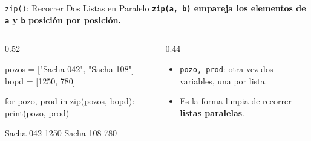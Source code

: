\documentclass[aspectratio=169, 11pt]{beamer}
\begin{document}
\begin{frame}[fragile,shrink=18]{\texttt{zip()}: Recorrer Dos Listas en Paralelo}
  \vspace{-4pt}
  {\small\color{arcaDark}\bfseries
    \texttt{zip(a, b)} empareja los elementos de \texttt{a} y \texttt{b} posición por posición.}

  \vspace{5pt}
  \begin{columns}[T]
    \begin{column}{0.52\textwidth}
      \begin{pyblock}
pozos = ["Sacha-042", "Sacha-108"]
bopd  = [1250, 780]

for pozo, prod in zip(pozos, bopd):
    print(pozo, prod)
      \end{pyblock}
      \vspace{2pt}
      \begin{outputblock}
Sacha-042 1250
Sacha-108 780
      \end{outputblock}
    \end{column}

    \begin{column}{0.44\textwidth}
      {\scriptsize\color{textMuted}
      \begin{itemize}\setlength{\itemsep}{5pt}
        \item[{\color{arcaRed}\scriptsize\faArrowRight}]
          \texttt{pozo, prod}: otra vez dos
          variables, una por lista.
        \item[{\color{codeGreen}\scriptsize\faCheck}]
          Es la forma limpia de recorrer
          \textbf{listas paralelas}.
      \end{itemize}
      }
    \end{column}
  \end{columns}
\end{frame}
\end{document}
